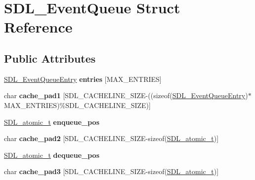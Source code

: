 \hypertarget{structSDL__EventQueue}{\section{S\+D\+L\+\_\+\+Event\+Queue Struct Reference}
\label{structSDL__EventQueue}
}
\subsection*{Public Attributes}
\begin{DoxyCompactItemize}
\item 
\hypertarget{structSDL__EventQueue_a7823a668b7f54be749cce9c424f3b680}{\hyperlink{structSDL__EventQueueEntry}{S\+D\+L\+\_\+\+Event\+Queue\+Entry} {\bfseries entries} \mbox{[}M\+A\+X\+\_\+\+E\+N\+T\+R\+I\+E\+S\mbox{]}}\label{structSDL__EventQueue_a7823a668b7f54be749cce9c424f3b680}

\item 
\hypertarget{structSDL__EventQueue_a542f7d779dfdc510ab2998b19400b14a}{char {\bfseries cache\+\_\+pad1} \mbox{[}S\+D\+L\+\_\+\+C\+A\+C\+H\+E\+L\+I\+N\+E\+\_\+\+S\+I\+Z\+E-\/((sizeof(\hyperlink{structSDL__EventQueueEntry}{S\+D\+L\+\_\+\+Event\+Queue\+Entry})$\ast$M\+A\+X\+\_\+\+E\+N\+T\+R\+I\+E\+S)\%S\+D\+L\+\_\+\+C\+A\+C\+H\+E\+L\+I\+N\+E\+\_\+\+S\+I\+Z\+E)\mbox{]}}\label{structSDL__EventQueue_a542f7d779dfdc510ab2998b19400b14a}

\item 
\hypertarget{structSDL__EventQueue_af8806dee54c335542edff9b12076d36d}{\hyperlink{structSDL__atomic__t}{S\+D\+L\+\_\+atomic\+\_\+t} {\bfseries enqueue\+\_\+pos}}\label{structSDL__EventQueue_af8806dee54c335542edff9b12076d36d}

\item 
\hypertarget{structSDL__EventQueue_a9bf8fe9affd9a3701e74a361fe4d707f}{char {\bfseries cache\+\_\+pad2} \mbox{[}S\+D\+L\+\_\+\+C\+A\+C\+H\+E\+L\+I\+N\+E\+\_\+\+S\+I\+Z\+E-\/sizeof(\hyperlink{structSDL__atomic__t}{S\+D\+L\+\_\+atomic\+\_\+t})\mbox{]}}\label{structSDL__EventQueue_a9bf8fe9affd9a3701e74a361fe4d707f}

\item 
\hypertarget{structSDL__EventQueue_adbaa58f38eae61362b577121e103773a}{\hyperlink{structSDL__atomic__t}{S\+D\+L\+\_\+atomic\+\_\+t} {\bfseries dequeue\+\_\+pos}}\label{structSDL__EventQueue_adbaa58f38eae61362b577121e103773a}

\item 
\hypertarget{structSDL__EventQueue_acf4c58c4c5633e953e5336eb9218571f}{char {\bfseries cache\+\_\+pad3} \mbox{[}S\+D\+L\+\_\+\+C\+A\+C\+H\+E\+L\+I\+N\+E\+\_\+\+S\+I\+Z\+E-\/sizeof(\hyperlink{structSDL__atomic__t}{S\+D\+L\+\_\+atomic\+\_\+t})\mbox{]}}\label{structSDL__EventQueue_acf4c58c4c5633e953e5336eb9218571f}


\end{DoxyCompactItemize}
